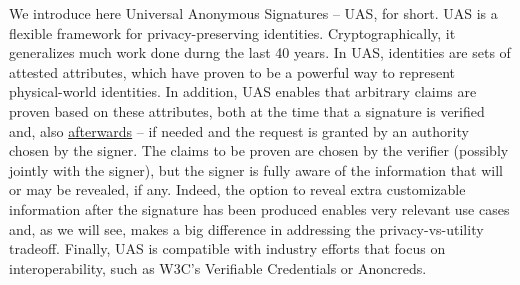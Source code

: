 We introduce here Universal Anonymous Signatures -- UAS, for short. UAS
is a flexible framework for privacy-preserving identities. Cryptographically,
it generalizes much work done durng the last 40 years. In UAS, identities are
sets of attested attributes, which have proven to be a powerful way to represent
physical-world identities. In addition, UAS enables that arbitrary claims are
proven based on these attributes, both at the time that a signature is verified
and, also \uline{afterwards} -- if needed and the request is granted by an
authority chosen by the signer. The claims to be proven are chosen by the
verifier (possibly jointly with the signer), but the signer is fully aware of
the information that will or may be revealed, if any. Indeed, the option to
reveal extra customizable information after the signature has been produced
enables very relevant use cases and, as we will see, makes a big difference in
addressing the privacy-vs-utility tradeoff. Finally, UAS is compatible with
industry efforts that focus on interoperability, such as W3C's Verifiable
Credentials or Anoncreds.

